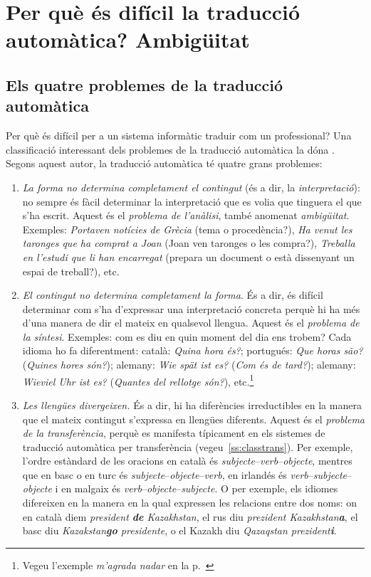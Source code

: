 \chapter[Per què és difícil la TA? Ambigüitat]{Per què és difícil la
  traducció automàtica? Ambigüitat}
\label{se:ambig}


\section{Els quatre problemes de la traducció automàtica}
Per què és difícil per a un sistema informàtic traduir com un
professional?  Una classificació interessant dels problemes de la
traducció automàtica la dóna \cite{arnold03p}. Segons aquest autor, la
traducció automàtica té quatre grans problemes:
\begin{enumerate}
\item \emph{La forma no determina completament el contingut} (és a
  dir, la \emph{interpretació}): no sempre és fàcil determinar la
  interpretació que es volia que tinguera el que s'ha escrit. Aquest
  és el \emph{problema de l'anàlisi}, també anomenat
  \emph{ambigüitat}. Exemples: \emph{Portaven notícies de Grècia}
  (tema o procedència?), \emph{Ha venut les taronges que ha comprat a
    Joan} (Joan ven taronges o les compra?), \emph{Treballa en
    l'estudi que li han encarregat} (prepara un document o està
  dissenyant un espai de treball?), etc.

\item \emph{El contingut no determina completament la forma}. És a
  dir, és difícil determinar com s'ha d'expressar una interpretació
  concreta perquè hi ha més d'una manera de dir el mateix en qualsevol
  llengua. Aquest és el \emph{problema de la síntesi}. Exemples: com
  es diu en quin moment del dia ens trobem?  Cada idioma ho fa
  diferentment: català: \emph{Quina hora és?}; portugués: \emph{Que
    horas são?} (\emph{Quines hores són?}); alemany: \emph{Wie spät
    ist es?} (\emph{Com és de tard?}); alemany: \emph{Wieviel Uhr ist
    es?} (\emph{Quantes del rellotge són?}), etc.\footnote{Vegeu
    l'exemple \emph{m'agrada nadar} en la
    p.~\pageref{pg:magradanadar}}

\item \emph{Les llengües divergeixen.} És a dir, hi ha diferències
  irreductibles en la manera que el mateix contingut s'expressa en
  llengües diferents. Aquest és el \emph{problema de la
    transferència}, perquè es manifesta típicament en els sistemes de
  traducció automàtica per transferència
  (vegeu~\ref{ss:classtrans}). Per exemple, l'ordre estàndard de les
  oracions en català és \emph{subjecte}--\emph{verb}--\emph{objecte},
  mentres que en basc o en turc és
  \emph{subjecte}--\emph{objecte}--\emph{verb}, en irlandés és
  \emph{verb}--\emph{subjecte}--\emph{objecte} i en malgaix és
  \emph{verb}--\emph{objecte}--\emph{subjecte}.  O per exemple, els
  idiomes difereixen en la manera en la qual expressen les relacions
  entre dos noms: on en català diem \emph{president \textbf{de}
    Kazakhstan}, el rus diu \emph{prezident Kazakhstan\textbf{a}}, el
  basc diu \emph{Kazakstan\textbf{go} presidente}, o el Kazakh diu
  \emph{Qazaqstan prezident\textbf{i}}.


\end{enumerate}
